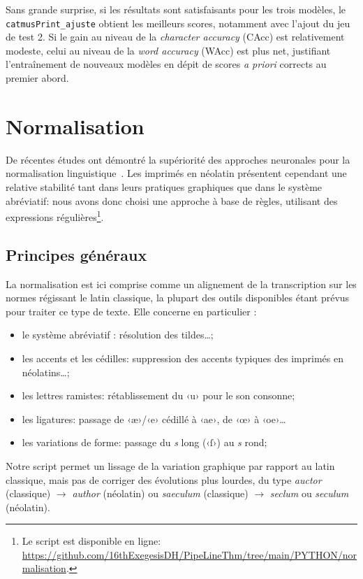 \documentclass[11pt,french]{article}
\begin{document}
Sans grande surprise, si les résultats sont satisfaisants pour les trois modèles, le \texttt{catmusPrint\_ajuste} obtient les meilleurs scores, notamment avec l'ajout du jeu de test 2. Si le gain au niveau de la \textit{character accuracy} (CAcc) est relativement modeste, celui au niveau de la \textit{word accuracy} (WAcc) est plus net, justifiant l'entraînement de nouveaux modèles en dépit de scores \textit{a priori} corrects au premier abord.

\section{Normalisation}
\label{sec:normalisation}
De récentes études ont démontré la supériorité des approches neuronales pour la normalisation linguistique~\cite{gabay-barrault-2020-traduction,bawden:hal-03540226}. Les imprimés en néolatin présentent cependant une relative stabilité tant dans leurs pratiques graphiques que dans le système abréviatif: nous avons donc choisi une approche à base de règles, utilisant des expressions régulières\footnote{Le script est disponible en ligne: \url{https://github.com/16thExegesisDH/PipeLineThm/tree/main/PYTHON/normalisation}.}.

\subsection{Principes généraux}

La normalisation est ici comprise comme un alignement de la transcription sur les normes régissant le latin classique, la plupart des outils disponibles étant prévus pour traiter ce type de texte. Elle concerne en particulier : 

\begin{itemize}
    \item le système abréviatif : résolution des tildes…;
    \item les accents et les cédilles: suppression des accents typiques des imprimés en néolatins…; 
    \item les lettres ramistes: rétablissement du ‹u› pour le son consonne;
    \item les ligatures: passage de ‹æ›/‹e› cédillé à ‹ae›, de ‹œ› à ‹oe›…
    \item les variations de forme: passage du \textit{s} long (‹ſ›) au \textit{s} rond;
\end{itemize}

Notre script permet un lissage de la variation graphique par rapport au latin classique, mais pas de corriger des évolutions plus lourdes, du type \textit{auctor} (classique) $\to$ \textit{author} (néolatin) ou \textit{saeculum} (classique) $\to$ \textit{seclum} ou \textit{seculum} (néolatin).
\end{document}
